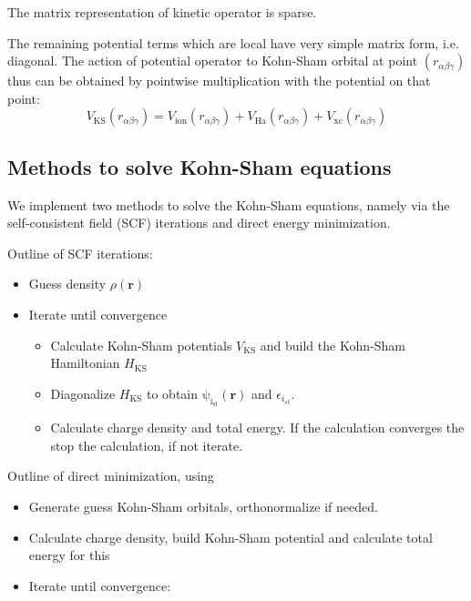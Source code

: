 The matrix representation of kinetic operator is sparse.

The remaining potential terms which are local have very simple matrix form, i.e.
diagonal. The action of potential operator to Kohn-Sham orbital at point
$(r_{\alpha\beta\gamma})$ thus can be
obtained by pointwise multiplication with the potential on that point:
\begin{equation}
V_{\mathrm{KS}}(r_{\alpha\beta\gamma}) = V_{\mathrm{ion}}(r_{\alpha\beta\gamma}) +
V_{\mathrm{Ha}}(r_{\alpha\beta\gamma}) + V_{\mathrm{xc}}(r_{\alpha\beta\gamma})
\end{equation}

\subsection{Methods to solve Kohn-Sham equations}

We implement two methods to solve the Kohn-Sham equations, namely
via the self-consistent field (SCF) iterations and
direct energy minimization.

Outline of SCF iterations:
\begin{itemize}
\item Guess density $\rho(\mathbf{r})$
\item Iterate until convergence
\begin{itemize}
\item Calculate Kohn-Sham potentials $V_{\mathrm{KS}}$ and build the Kohn-Sham
Hamiltonian $H_{\mathrm{KS}}$
\item Diagonalize $H_{\mathrm{KS}}$ to obtain $\mathrm{\psi_{i_{st}}}(\mathbf{r})$
and $\epsilon_{i_{st}}$.
\item Calculate charge density and total energy. If the calculation converges
the stop the calculation, if not iterate.
\end{itemize}
\end{itemize}

Outline of direct minimization, using 
\begin{itemize}
\item Generate guess Kohn-Sham orbitals, orthonormalize if needed.
\item Calculate charge density, build Kohn-Sham potential and calculate total energy
for this
\item Iterate until convergence:
%
%
\end{itemize}
